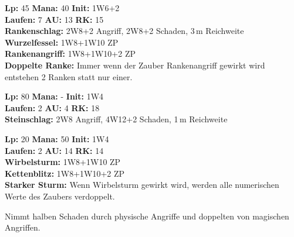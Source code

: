 \documentclass[../../Heldenanleitung2]{subfiles}
\begin{document}
\begin{multicols}{2}
\begin{tcolorbox}[title={Humuselementar},colbacktitle=green, coltitle=black]    
   \textbf{Lp:} 45
   \textbf{Mana:} 40
   \textbf{Init:} 1W6+2\\
   \textbf{Laufen:} 7
   \textbf{AU:} 13
   \textbf{RK:} 15\\
   
   \textbf{Rankenschlag:} 2W8+2 Angriff, 2W8+2 Schaden, 3\,m Reichweite\\
   
   \textbf{Wurzelfessel:} 1W8+1W10 ZP\\
   
   \textbf{Rankenangriff:} 1W8+1W10+2 ZP\\
   
   \textbf{Doppelte Ranke:} Immer wenn der Zauber Rankenangriff gewirkt wird entstehen 2 Ranken statt nur einer.
\end{tcolorbox}

\begin{tcolorbox}[title={Erzelementar},colbacktitle=brown, coltitle=white]    
   \textbf{Lp:} 80
   \textbf{Mana:} -
   \textbf{Init:} 1W4\\
   \textbf{Laufen:} 2
   \textbf{AU:} 4
   \textbf{RK:} 18\\
   
   \textbf{Steinschlag:} 2W8 Angriff, 4W12+2 Schaden, 1\,m Reichweite\\
\end{tcolorbox}

\begin{tcolorbox}[title={Luftelementar},colbacktitle=white, coltitle=black]    
   \textbf{Lp:} 20
   \textbf{Mana:} 50
   \textbf{Init:} 1W4\\
   \textbf{Laufen:} 2
   \textbf{AU:} 14
   \textbf{RK:} 14\\
   
   \textbf{Wirbelsturm:} 1W8+1W10 ZP\\
   
   \textbf{Kettenblitz:} 1W8+1W10+2 ZP\\
   
   \textbf{Starker Sturm:} Wenn Wirbelsturm gewirkt wird, werden alle numerischen Werte des Zaubers verdoppelt.
   
   Nimmt halben Schaden durch physische Angriffe und doppelten von magischen Angriffen.
\end{tcolorbox}

\end{multicols}
\end{document}

